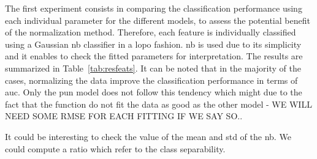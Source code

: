 The first experiment consists in comparing the classification performance using each individual parameter for the different models, to assess the potential benefit of the normalization method.
Therefore, each feature is individually classified using a Gaussian \ac{nb} classifier in a \ac{lopo} fashion.
{\color{red}\ac{nb} is used due to its simplicity and it enables to check the fitted parameters for interpretation.}
The results are summarized in Table~\ref{tab:resfeats}.
It can be noted that in the majority of the cases, normalizing the data improve the classification performance in terms of \ac{auc}.
Only the \ac{pun} model does not follow this tendency {\color{red} which might due to the fact that the function do not fit the data as good as the other model - WE WILL NEED SOME RMSE FOR EACH FITTING IF WE SAY SO.}.

{\color{red}It could be interesting to check the value of the mean and std of the \ac{nb}. We could compute a ratio which refer to the class separability.}


